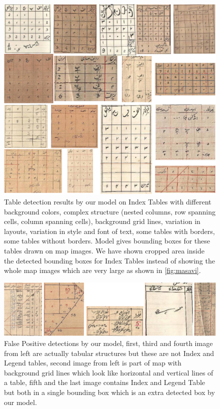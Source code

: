 \begin{figure}[h!]
    \centering
    \includegraphics[width=\linewidth, angle=0]{indexTables.pdf}
    \caption{Table detection results by our model on Index Tables with different background colors, complex structure (nested columns, row spanning cells, column spanning cells), background grid lines, variation in layouts, variation in style and font of text, some tables with borders, some tables without borders. Model gives bounding boxes for these tables drawn on map images. We have shown cropped area inside the detected bounding boxes for Index Tables instead of showing the whole map images which are very large as shown in \autoref{fig:masavi}.}
    \label{fig:indexTables}
\end{figure}

\begin{figure}[h!]
    \centering
    \includegraphics[width=\linewidth, angle=0]{FalsePositiveTables.pdf}
    \caption{False Positive detections by our model, first, third and fourth image from left are actually tabular structures but these are not Index and Legend tables, second image from left is part of map with background grid lines which look like horizontal and vertical lines of a table, fifth and the last image contains Index and Legend Table but both in a single bounding box which is an extra detected box by our model.}
    \label{fig:FalsePositiveTables}
\end{figure}

